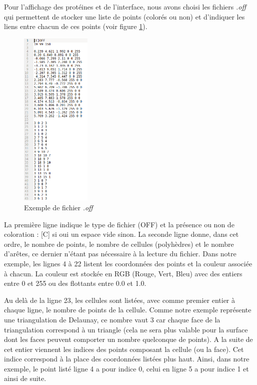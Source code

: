 Pour l'affichage des protéines et de l'interface, nous avons choisi les fichiers
\textit{.off} qui permettent de stocker une liste de points (colorés ou non) et
d'indiquer les liens entre chacun de ces points (voir figure \ref{fig::off_file}).

\begin{figure}[ht]
\centering
  \includegraphics[width=0.3\textwidth]{figures/off_file.png}
  \caption{Exemple de fichier \textit{.off}}
  \label{fig::off_file}
\end{figure}

La première ligne indique le type de fichier (OFF) et la présence ou non de coloration :
[C] si oui un espace vide sinon. La seconde ligne donne, dans cet ordre, le nombre
de points, le nombre de cellules (polyhèdres) et le nombre d'arêtes, ce dernier n'étant
pas nécessaire à la lecture du fichier. Dans notre exemple, les lignes 4 à 22 listent
les coordonnées des points et la couleur associée à chacun. La couleur est stockée en RGB
(Rouge, Vert, Bleu) avec des entiers entre 0 et 255 ou des flottants entre 0.0 et 1.0.

Au delà de la ligne 23, les cellules sont listées, avec comme premier entier à chaque
ligne, le nombre de points de la cellule. Comme notre exemple représente une triangulation
de Delaunay, ce nombre vaut 3 car chaque face de la triangulation correspond à un
triangle (cela ne sera plus valable pour la surface dont les faces peuvent comporter un nombre
quelconque de points). A la suite de cet entier viennent les indices des points composant la cellule
(ou la face). Cet indice correspond à la place des coordonnées listées plus haut. Ainsi,
dans notre exemple, le point listé ligne 4 a pour indice 0, celui en ligne 5 a pour indice 1
et ainsi de suite.

